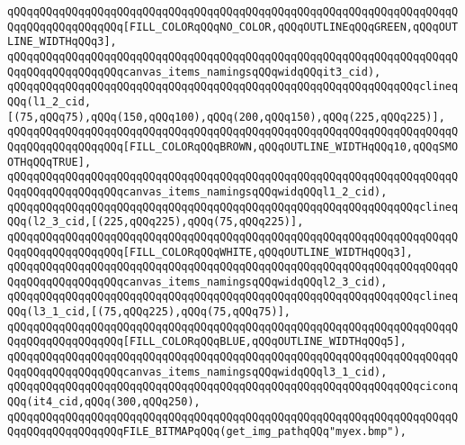 \verb|qQQqqQQqqQQqqQQqqQQqqQQqqQQqqQQqqQQqqQQqqQQqqQQqqQQqqQQqqQQqqQQqqQQqqQQqqQQqqQQqqQQqqQQq[FILL_COLORqQQqNO_COLOR,qQQqOUTLINEqQQqGREEN,qQQqOUTLINE_WIDTHqQQq3],|\newline
\verb|qQQqqQQqqQQqqQQqqQQqqQQqqQQqqQQqqQQqqQQqqQQqqQQqqQQqqQQqqQQqqQQqqQQqqQQqqQQqqQQqqQQqqQQqcanvas_items_namingsqQQqwidqQQqit3_cid),|\newline
\newline
\verb|qQQqqQQqqQQqqQQqqQQqqQQqqQQqqQQqqQQqqQQqqQQqqQQqqQQqqQQqqQQqqQQqclineqQQq(l1_2_cid,[(75,qQQq75),qQQq(150,qQQq100),qQQq(200,qQQq150),qQQq(225,qQQq225)],|\newline
\verb|qQQqqQQqqQQqqQQqqQQqqQQqqQQqqQQqqQQqqQQqqQQqqQQqqQQqqQQqqQQqqQQqqQQqqQQqqQQqqQQqqQQqqQQq[FILL_COLORqQQqBROWN,qQQqOUTLINE_WIDTHqQQq10,qQQqSMOOTHqQQqTRUE],|\newline
\verb|qQQqqQQqqQQqqQQqqQQqqQQqqQQqqQQqqQQqqQQqqQQqqQQqqQQqqQQqqQQqqQQqqQQqqQQqqQQqqQQqqQQqqQQqcanvas_items_namingsqQQqwidqQQql1_2_cid),|\newline
\newline
\verb|qQQqqQQqqQQqqQQqqQQqqQQqqQQqqQQqqQQqqQQqqQQqqQQqqQQqqQQqqQQqqQQqclineqQQq(l2_3_cid,[(225,qQQq225),qQQq(75,qQQq225)],|\newline
\verb|qQQqqQQqqQQqqQQqqQQqqQQqqQQqqQQqqQQqqQQqqQQqqQQqqQQqqQQqqQQqqQQqqQQqqQQqqQQqqQQqqQQqqQQq[FILL_COLORqQQqWHITE,qQQqOUTLINE_WIDTHqQQq3],|\newline
\verb|qQQqqQQqqQQqqQQqqQQqqQQqqQQqqQQqqQQqqQQqqQQqqQQqqQQqqQQqqQQqqQQqqQQqqQQqqQQqqQQqqQQqqQQqcanvas_items_namingsqQQqwidqQQql2_3_cid),|\newline
\newline
\verb|qQQqqQQqqQQqqQQqqQQqqQQqqQQqqQQqqQQqqQQqqQQqqQQqqQQqqQQqqQQqqQQqclineqQQq(l3_1_cid,[(75,qQQq225),qQQq(75,qQQq75)],|\newline
\verb|qQQqqQQqqQQqqQQqqQQqqQQqqQQqqQQqqQQqqQQqqQQqqQQqqQQqqQQqqQQqqQQqqQQqqQQqqQQqqQQqqQQqqQQq[FILL_COLORqQQqBLUE,qQQqOUTLINE_WIDTHqQQq5],|\newline
\verb|qQQqqQQqqQQqqQQqqQQqqQQqqQQqqQQqqQQqqQQqqQQqqQQqqQQqqQQqqQQqqQQqqQQqqQQqqQQqqQQqqQQqqQQqcanvas_items_namingsqQQqwidqQQql3_1_cid),|\newline
\newline
\verb|qQQqqQQqqQQqqQQqqQQqqQQqqQQqqQQqqQQqqQQqqQQqqQQqqQQqqQQqqQQqqQQqciconqQQq(it4_cid,qQQq(300,qQQq250),|\newline
\verb|qQQqqQQqqQQqqQQqqQQqqQQqqQQqqQQqqQQqqQQqqQQqqQQqqQQqqQQqqQQqqQQqqQQqqQQqqQQqqQQqqQQqqQQqFILE_BITMAPqQQq(get_img_pathqQQq"myex.bmp"),|\newline
